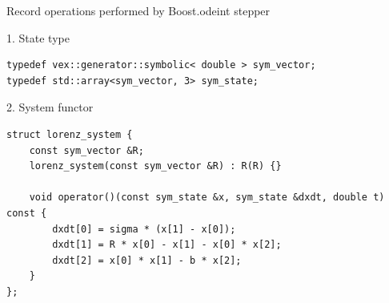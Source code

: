 \documentclass[@BEAMER_OPTIONS@]{beamer}
\begin{document}

\begin{frame}[fragile]{Record operations performed by Boost.odeint stepper}
    \begin{exampleblock}{1. State type}
        \begin{lstlisting}
typedef vex::generator::symbolic< double > sym_vector;
typedef std::array<sym_vector, 3> sym_state;
        \end{lstlisting}
    \end{exampleblock}

    \begin{exampleblock}{2. System functor}
        \begin{lstlisting}[firstnumber=last]
struct lorenz_system {
    const sym_vector &R;
    lorenz_system(const sym_vector &R) : R(R) {}

    void operator()(const sym_state &x, sym_state &dxdt, double t) const {
        dxdt[0] = sigma * (x[1] - x[0]);
        dxdt[1] = R * x[0] - x[1] - x[0] * x[2];
        dxdt[2] = x[0] * x[1] - b * x[2];
    }
};
        \end{lstlisting}
    \end{exampleblock}
\end{frame}

\end{document}
